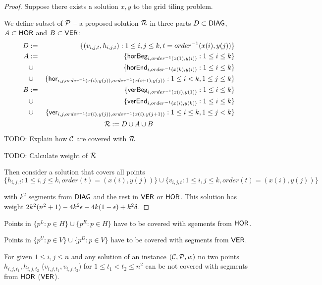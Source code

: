 \begin{proof}
Suppose there exists a solution $x,y$ to the grid tiling problem.
	
We define subset of $\mathcal{P}$ -- a proposed solution $\mathcal{R}$
in three parts $D \subset \mathsf{DIAG}$, $A \subset \mathsf{HOR}$ and $B \subset \mathsf{VER}$:
\begin{eqnarray*}
	D & := & \{(v_{i, j, t}, h_{i, j, t}) : 1 \le i, j \le k, t = order^{-1}(x(i), y(j))\} \\
	A & := & \{\mathsf{horBeg}_{i,order^{-1}(x(1), y(i))} : 1 \le i \le k\} \\
	& \cup & \{\mathsf{horEnd}_{i,order^{-1}(x(k), y(i))} : 1 \le i \le k\} \\
	& \cup & \{\mathsf{hor}_{i,j,order^{-1}(x(i), y(j)),order^{-1}(x(i+1), y(j))} : 1 \le i < k, 1 \le j \le k\} \\
	B & := & \{\mathsf{verBeg}_{i,order^{-1}(x(i), y(1))} : 1 \le i \le k\} \\
	& \cup & \{\mathsf{verEnd}_{i,order^{-1}(x(i), y(k))} : 1 \le i \le k\} \\
	& \cup & \{\mathsf{ver}_{i,j,order^{-1}(x(i), y(j)),order^{-1}(x(i), y(j+1))} : 1 \le i \le k, 1 \le j < k\} 
\end{eqnarray*}
	$$\mathcal{R} := D \cup A \cup B$$

TODO: Explain how $\mathcal{C}$ are covered with $\mathcal{R}$

TODO: Calculate weight of $\mathcal{R}$
	
Then consider a solution that covers
all points
$$\{h_{i, j, t} : 1 \le i, j \le k, order(t)=(x(i), y(j))\}
\cup \{v_{i, j, t} : 1 \le i, j \le k, order(t)=(x(i), y(j))\}$$

with $k^2$ segments from $\mathsf{DIAG}$
and the rest in $\mathsf{VER}$ or $\mathsf{HOR}$.
This solution has weight $2k^2(n^2+1) - 4k^2\epsilon -4k(1-\epsilon) +k^2\delta$.
	
	
\end{proof}


\begin{claim}
\label{guards}
Points in $\{p^L : p \in H\} \cup \{p^R : p \in H\}$
have to be covered with sgements from $\mathsf{HOR}$.

Points in $\{p^U : p \in V\} \cup \{p^D : p \in V\} $
have to be covered with segments from $\mathsf{VER}$.
\end{claim}


\begin{claim}
\label{one_diag_in_square}
For given $1 \le i, j \le n$
and any solution of an instance $(\mathcal{C}, \mathcal{P}, w)$
no two points $h_{i, j, t_1}, h_{i, j, t_2}$
($v_{i, j, t_1}, v_{i, j, t_2}$)
for $1 \le t_1 < t_2 \le n^2$
can be not covered with segments from $\mathsf{HOR}$ ($\mathsf{VER}$).
\end{claim}

